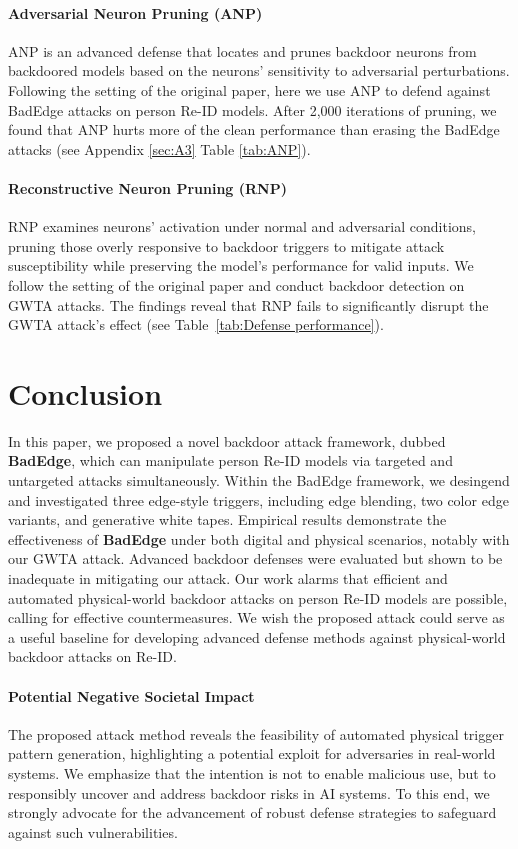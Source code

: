 \documentclass[sigconf,authordraft]{acmart}
\begin{document}
\paragraph{Adversarial Neuron Pruning (ANP)}
ANP is an advanced defense \cite{wu2021adversarial} that locates and prunes backdoor neurons from backdoored models based on the neurons' sensitivity to adversarial perturbations. Following the setting of the original paper, here we use ANP to defend against BadEdge attacks on person Re-ID models. After 2,000 iterations of pruning, we found that ANP hurts more of the clean performance than erasing the BadEdge attacks (see Appendix \ref{sec:A3} Table \ref{tab:ANP}).

\paragraph{Reconstructive Neuron Pruning (RNP)}
RNP examines neurons' activation under normal and adversarial conditions, pruning those overly responsive to backdoor triggers to mitigate attack susceptibility while preserving the model's performance for valid inputs. We follow the setting of the original paper and conduct backdoor detection on GWTA attacks. The findings reveal that RNP fails to significantly disrupt the GWTA attack's effect (see Table~\ref{tab:Defense performance}).

\section{Conclusion}\label{sec:conclusion}
In this paper, we proposed a novel backdoor attack framework, dubbed \textbf{BadEdge}, which can manipulate person Re-ID models via targeted and untargeted attacks simultaneously.
Within the BadEdge framework, we desingend and investigated three edge-style triggers, including edge blending, two color edge variants, and generative white tapes. 
Empirical results demonstrate the effectiveness of \textbf{BadEdge} under both digital and physical scenarios, notably with our GWTA attack.
Advanced backdoor defenses were evaluated but shown to be inadequate in mitigating our attack. 
Our work alarms that efficient and automated physical-world backdoor attacks on person Re-ID models are possible, calling for effective countermeasures. We wish the proposed attack could serve as a useful baseline for developing advanced defense methods against physical-world backdoor attacks on Re-ID.

\paragraph{Potential Negative Societal Impact} The proposed attack method reveals the feasibility of automated physical trigger pattern generation, highlighting a potential exploit for adversaries in real-world systems. We emphasize that the intention is not to enable malicious use, but to responsibly uncover and address backdoor risks in AI systems. To this end, we strongly advocate for the advancement of robust defense strategies to safeguard against such vulnerabilities.
\end{document}
